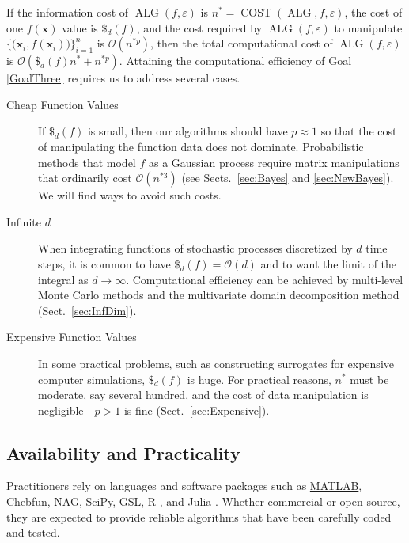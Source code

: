\documentclass[11pt]{NSFamsart}
\newcommand{\SciPy}{\hyperlink{SciPylink}{SciPy}\xspace}
\newcommand{\GSL}{\hyperlink{GSLlink}{GSL}\xspace}
\newcommand{\NAG}{\hyperlink{NAGlink}{NAG}\xspace}
\newcommand{\MATLAB}{\hyperlink{MATLABlink}{MATLAB}\xspace}
\newcommand{\Chebfun}{\hyperlink{Chebfunlink}{Chebfun}\xspace}
\DeclareMathOperator{\cost}{COST}
\DeclareMathOperator{\ALG}{ALG}
\newcommand{\bx}{{\boldsymbol{x}}}
\newcommand{\Order}{\mathcal{O}}
\newcommand{\dataN}{\bigl\{\bigl(\bx_i,f(\bx_i)\bigr)\bigr\}_{i=1}^n}
\begin{document}
If the information cost of $\ALG(f,\varepsilon)$ is $n^* = \cost(\ALG,f,\varepsilon)$, the cost of one $f(\bx)$ value is $\$_d(f)$, and the cost required by $\ALG(f,\varepsilon)$ to manipulate $\dataN$ is $\Order(n^{*p})$, then the total computational cost of $\ALG(f,\varepsilon)$ is $ \Order(\$_d(f)n^* + n^{*p})$.
Attaining the computational efficiency of Goal \ref{GoalThree} requires us to address several cases.  
\begin{description}

\item[Cheap Function Values]  If $\$_d(f)$ is small, then our algorithms should have $p \approx 1$ so that the cost of manipulating the function data does not dominate.  Probabilistic methods that model $f$ as a Gaussian process require matrix manipulations that ordinarily cost $\Order( n^{*3})$ (see Sects.\ \ref{sec:Bayes} and \ref{sec:NewBayes}).  We will find ways to avoid such costs.
    
    \item[Infinite $d$] When integrating functions of stochastic processes discretized by $d$ time steps, it is common to have $\$_d(f) = \Order(d)$ and to want the limit of the integral as $d \to \infty$.  Computational efficiency can be achieved by multi-level Monte Carlo methods and the multivariate domain decomposition method (Sect.\ \ref{sec:InfDim}).  

    \item[Expensive Function Values] In some practical  problems, such as constructing surrogates for expensive computer simulations,  $\$_d(f)$ is huge.  For practical reasons, $n^*$ must be moderate, say several hundred, and the cost of data manipulation is negligible---$p > 1$ is fine (Sect.\ \ref{sec:Expensive}).
\end{description}

\subsection{Availability and Practicality} \label{sec:AvailPract}

Practitioners rely on languages and software packages such as \MATLAB, \Chebfun, \NAG, \SciPy, \GSL, \hypertarget{Rlink}{R} \cite{R3.5.1_2018}, and \hypertarget{Julialink}{Julia} \cite{Julia1.0}. Whether commercial or open source, they are expected to provide reliable algorithms that have been carefully coded and tested.  
\end{document}
